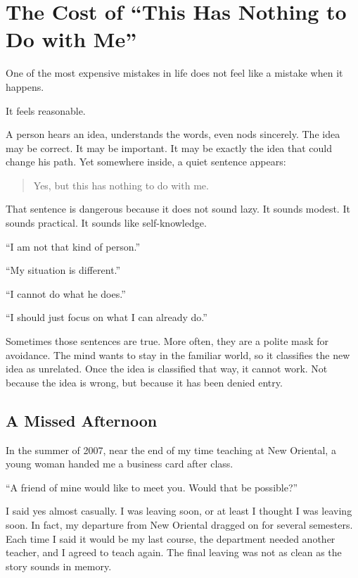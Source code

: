\chapter{The Cost of ``This Has Nothing to Do with Me''}

One of the most expensive mistakes in life does not feel like a mistake when it happens.

It feels reasonable.

A person hears an idea, understands the words, even nods sincerely. The idea may be correct. It may be important. It may be exactly the idea that could change his path. Yet somewhere inside, a quiet sentence appears:

\begin{quote}
Yes, but this has nothing to do with me.
\end{quote}

That sentence is dangerous because it does not sound lazy. It sounds modest. It sounds practical. It sounds like self-knowledge.

``I am not that kind of person.''

``My situation is different.''

``I cannot do what he does.''

``I should just focus on what I can already do.''

Sometimes those sentences are true. More often, they are a polite mask for avoidance. The mind wants to stay in the familiar world, so it classifies the new idea as unrelated. Once the idea is classified that way, it cannot work. Not because the idea is wrong, but because it has been denied entry.

\section*{A Missed Afternoon}

In the summer of 2007, near the end of my time teaching at New Oriental, a young woman handed me a business card after class.

``A friend of mine would like to meet you. Would that be possible?''

I said yes almost casually. I was leaving soon, or at least I thought I was leaving soon. In fact, my departure from New Oriental dragged on for several semesters. Each time I said it would be my last course, the department needed another teacher, and I agreed to teach again. The final leaving was not as clean as the story sounds in memory.

